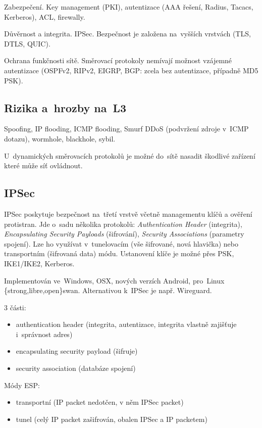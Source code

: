 Zabezpečení.
Key management (PKI), autentizace (AAA řešení, Radius, Tacacs, Kerberos), ACL, firewally.

Důvěrnost a integrita.
IPSec.
Bezpečnost je založena na~vyšších vrstvách (TLS, DTLS, QUIC).

Ochrana funkčnosti sítě.
Směrovací protokoly nemívají možnost vzájemné autentizace (OSPFv2, RIPv2, EIGRP, BGP: zcela bez autentizace, případně MD5 PSK).


\subsection{Rizika a~hrozby na~L3}

Spoofing, IP flooding, ICMP flooding, Smurf DDoS (podvržení zdroje v~ICMP dotazu), wormhole, blackhole, sybil.

U~dynamických směrovacích protokolů je možné do~sítě nasadit škodlivé zařízení které může síť ovládnout.


\subsection{IPSec}

IPSec poskytuje bezpečnost na~třetí vrstvě včetně managementu klíčů a ověření protistran.
Jde o~sadu několika protokolů: \emph{Authentication Header} (integrita), \emph{Encapsulating Security Payloads} (šifrování), \emph{Security Associations} (parametry spojení).
Lze ho využívat v~tunelovacím (vše šifrované, nová hlavička) nebo transportním (šifrovaná data) módu.
Ustanovení klíče je možné přes PSK, IKE1/IKE2, Kerberos.

Implementován ve~Windows, OSX, nových verzích Android, pro~Linux \{strong,libre,open\}swan.
Alternativou k~IPSec je např. Wireguard.

3 části:
\begin{itemize}
    \item authentication header (integrita, autentizace, integrita vlastně zajišťuje i~správnost adres)
    \item encapsulating security payload (šifruje)
    \item security association (databáze spojení)
\end{itemize}

Módy ESP:
\begin{itemize}
    \item transportní (IP packet nedotčen, v něm IPSec packet)
    \item tunel (celý IP packet zašifrován, obalen IPSec a IP packetem)
\end{itemize}


